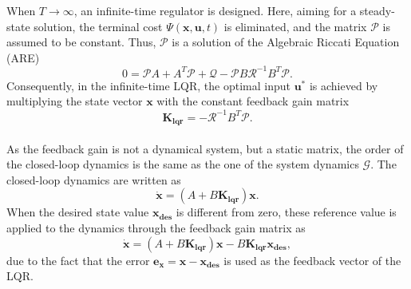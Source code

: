When $T \to \infty$, an infinite-time regulator is designed. Here, aiming for a steady-state solution, the terminal cost $\Psi(\mathbf{x}, \mathbf{u},t)$ is eliminated, and the matrix $\mathcal{P}$ is assumed to be constant. Thus, $\mathcal{P}$ is a solution of the Algebraic Riccati Equation (ARE)
	\begin{equation}
	0 = \mathcal{P}A + A^{T}\mathcal{P} + \mathcal{Q} - \mathcal{P}B\mathcal{R}^{-1}B^{T}\mathcal{P}.
	\end{equation}
Consequently, in the infinite-time LQR, the optimal input $\mathbf{u}^{*}$ is achieved by multiplying the state vector $\mathbf{x}$ with the constant feedback gain matrix
\begin{equation}
\mathbf{K_{lqr}} = -\mathcal{R}^{-1}B^{T}\mathcal{P}.
\end{equation}
\\As the feedback gain is not a dynamical system, but a static matrix, the order of the closed-loop dynamics is the same as the one of the system dynamics $\mathcal{G}$. The closed-loop dynamics are written as
\begin{equation}
\dot{\mathbf{x}} = (A+B\mathbf{K_{lqr}})\mathbf{x}.
\end{equation}
When the desired state value $\mathbf{x_{des}}$ is different from zero, these reference value is applied to the dynamics through the feedback gain matrix as
\begin{equation}
\dot{\mathbf{x}} = (A+B\mathbf{K_{lqr}})\mathbf{x}-B\mathbf{K_{lqr}}\mathbf{x_{des}},
\end{equation}
due to the fact that the error $\mathbf{e_x} = \mathbf{x} - \mathbf{x_{des}}$ is used as the feedback vector of the LQR.

